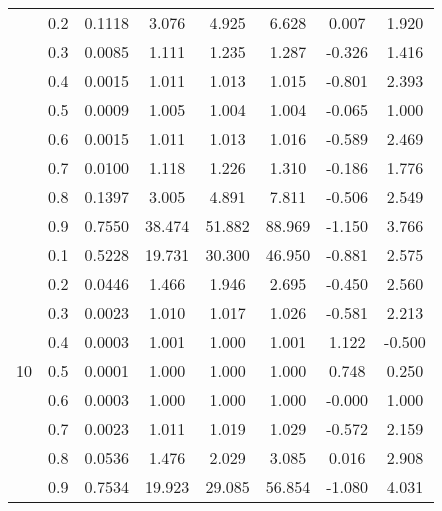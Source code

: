 \documentclass[11pt,a4paper]{report}
\begin{document}
\begin{longtable}{ | c | c || c | c | c | c | c | c | }
 & 0.2 & 0.1118 & 3.076 & 4.925 & 6.628 & 0.007 & 1.920 \\
 & 0.3 & 0.0085 & 1.111 & 1.235 & 1.287 & -0.326 & 1.416 \\
 & 0.4 & 0.0015 & 1.011 & 1.013 & 1.015 & -0.801 & 2.393 \\
 & 0.5 & 0.0009 & 1.005 & 1.004 & 1.004 & -0.065 & 1.000 \\
 & 0.6 & 0.0015 & 1.011 & 1.013 & 1.016 & -0.589 & 2.469 \\
 & 0.7 & 0.0100 & 1.118 & 1.226 & 1.310 & -0.186 & 1.776 \\
 & 0.8 & 0.1397 & 3.005 & 4.891 & 7.811 & -0.506 & 2.549 \\
 & 0.9 & 0.7550 & 38.474 & 51.882 & 88.969 & -1.150 & 3.766 \\
 \hline
\multirow{9}{*}{10} & 0.1 & 0.5228 & 19.731 & 30.300 & 46.950 & -0.881 & 2.575 \\
 & 0.2 & 0.0446 & 1.466 & 1.946 & 2.695 & -0.450 & 2.560 \\
 & 0.3 & 0.0023 & 1.010 & 1.017 & 1.026 & -0.581 & 2.213 \\
 & 0.4 & 0.0003 & 1.001 & 1.000 & 1.001 & 1.122 & -0.500 \\
 & 0.5 & 0.0001 & 1.000 & 1.000 & 1.000 & 0.748 & 0.250 \\
 & 0.6 & 0.0003 & 1.000 & 1.000 & 1.000 & -0.000 & 1.000 \\
 & 0.7 & 0.0023 & 1.011 & 1.019 & 1.029 & -0.572 & 2.159 \\
 & 0.8 & 0.0536 & 1.476 & 2.029 & 3.085 & 0.016 & 2.908 \\
 & 0.9 & 0.7534 & 19.923 & 29.085 & 56.854 & -1.080 & 4.031 \\
 \hline
\hline
\end{longtable}
\end{document}
